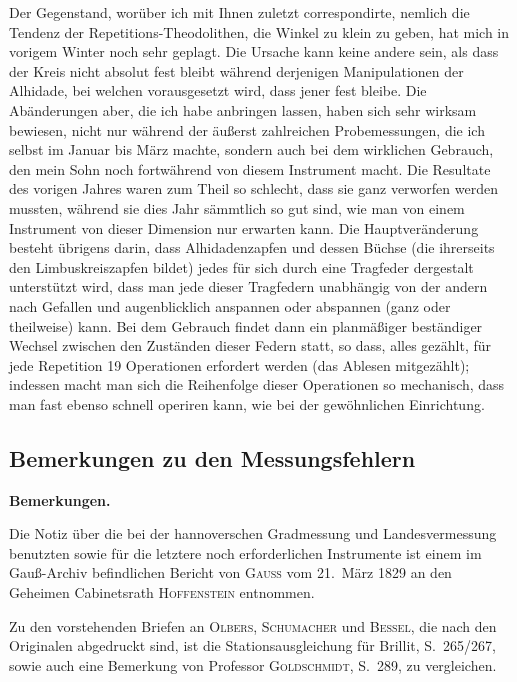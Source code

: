 \documentclass[12pt,a4paper]{article}
\theoremstyle{plain}
\theoremstyle{definition}
\theoremstyle{remark}
\begin{document}
Der Gegenstand, wor\"uber ich mit Ihnen zuletzt correspondirte, nemlich die Tendenz der Repetitions-Theodolithen, die Winkel zu klein zu geben, hat mich in vorigem Winter noch sehr geplagt. Die Ursache kann keine andere sein, als dass der Kreis nicht absolut fest bleibt w\"ahrend derjenigen Manipulationen der Alhidade, bei welchen vorausgesetzt wird, dass jener fest bleibe. Die Ab\"anderungen aber, die ich habe anbringen lassen, haben sich sehr wirksam bewiesen, nicht nur w\"ahrend der \"au\ss erst zahlreichen Probemessungen, die ich selbst im Januar bis M\"arz machte, sondern auch bei dem wirklichen Gebrauch, den mein Sohn noch fortw\"ahrend von diesem Instrument macht. Die Resultate des vorigen Jahres waren zum Theil so schlecht, dass sie ganz verworfen werden mussten, w\"ahrend sie dies Jahr s\"ammtlich so gut sind, wie man von einem Instrument von dieser Dimension nur erwarten kann. Die Hauptver\"anderung besteht \"ubrigens darin, dass Alhidadenzapfen und dessen B\"uchse (die ihrerseits den Limbuskreiszapfen bildet) jedes f\"ur sich durch eine Tragfeder dergestalt unterst\"utzt wird, dass man jede dieser Tragfedern unabh\"angig von der andern nach Gefallen und augenblicklich anspannen oder abspannen (ganz oder theilweise) kann. Bei dem Gebrauch findet dann ein planm\"a\ss iger best\"andiger Wechsel zwischen den Zust\"anden dieser Federn statt, so dass, alles gez\"ahlt, f\"ur jede Repetition 19 Operationen erfordert werden (das Ablesen mitgez\"ahlt); indessen macht man sich die Reihenfolge dieser Operationen so mechanisch, dass man fast ebenso schnell operiren kann, wie bei der gew\"ohnlichen Einrichtung.

\subsection*{Bemerkungen zu den Messungsfehlern}

\noindent
\textbf{Bemerkungen.}

Die Notiz \"uber die bei der hannoverschen Gradmessung und Landesvermessung benutzten sowie f\"ur die letztere noch erforderlichen Instrumente ist einem im Gau\ss-Archiv befindlichen Bericht von \textsc{Gau\ss{}} vom 21.\ M\"arz 1829 an den Geheimen Cabinetsrath \textsc{Hoffenstein} entnommen.

Zu den vorstehenden Briefen an \textsc{Olbers}, \textsc{Schumacher} und \textsc{Bessel}, die nach den Originalen abgedruckt sind, ist die Stationsausgleichung f\"ur Brillit, S.~265/267, sowie auch eine Bemerkung von Professor \textsc{Goldschmidt}, S.~289, zu vergleichen.
\end{document}
